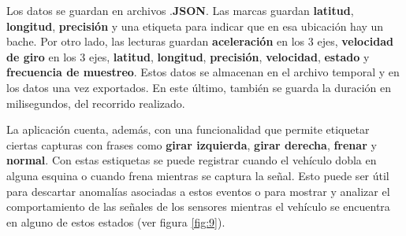 	Los datos se guardan en archivos .\textbf{JSON}. Las marcas guardan \textbf{latitud}, \textbf{longitud}, \textbf{precisión} y una 
	etiqueta para indicar que en esa ubicación hay un bache. Por otro lado, las lecturas guardan \textbf{aceleración} en los 3 ejes, 
	\textbf{velocidad de giro} en los 3 ejes, \textbf{latitud}, \textbf{longitud}, \textbf{precisión}, \textbf{velocidad}, \textbf{estado}
	y \textbf{frecuencia de muestreo}. Estos datos se almacenan en el archivo temporal y en los datos una vez exportados. En este último, también 
	se guarda la duración en milisegundos, del recorrido realizado.

	La aplicación cuenta, además, con una funcionalidad que permite etiquetar ciertas capturas con frases como \textbf{girar izquierda},
	\textbf{girar derecha}, \textbf{frenar} y \textbf{normal}. Con estas estiquetas se puede registrar cuando el vehículo dobla en alguna
	esquina o cuando frena mientras se captura la señal. Esto puede ser útil para descartar anomalías asociadas a estos eventos o
	para mostrar y analizar el comportamiento de las señales de los sensores mientras el vehículo se encuentra en alguno de estos estados
	(ver figura \ref{fig:9}).

